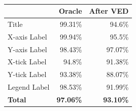 \documentclass[10pt,twocolumn,letterpaper]{article}
\begin{document}

\begin{table}[t]
\footnotesize
\begin{center}
\begin{tabular}{|l|r|r|}
\hline
& \textbf{Oracle} & \textbf{After VED}\\ \hline
Title & 99.31\% & 94.6\% \\
X-axis Label & 99.94\% & 95.5\% \\
Y-axis Label & 98.43\% & 97.07\% \\
X-tick Label & 94.8\% & 91.38\% \\
Y-tick Label & 93.38\% & 88.07\% \\
Legend Label & 98.53\% & 91.99\% \\
\hline
\textbf{Total} & \textbf{97.06\%} &\textbf{ 93.10\%} \\
\hline
\end{tabular}
\caption{}
\label{ocr-acc}
\end{center}
\end{table}
\end{document}

